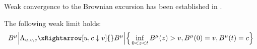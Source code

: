 %
%
%
Weak convergence to the Brownian excursion has been established in \cite{durrett77}. 
\begin{theorem}\label{thm:weak-conv-exc}
	The following weak limit holds:
	\begin{equation}\label{eq:weak-conv-exc}
	B^\mu \Big |\Lambda_{u,v,c} 
 \xRightarrow[u,c\downarrow v]{}
	B^\mu \Big | \Big \{ \inf_{ 0 < z < t } B^\mu(z) > v, B^\mu(0) = v, B^\mu(t) =c \Big \}
	\end{equation}
\end{theorem}
%

